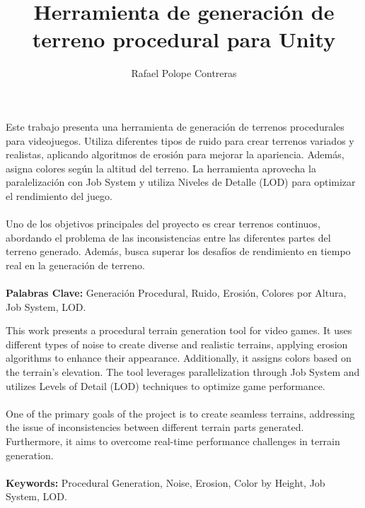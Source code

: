 \documentclass[book,spanish,a4paper,12pt]{tfg}
\title{Herramienta de generación de terreno procedural para Unity}
\author{Rafael Polope Contreras}
\begin{document}
\portada
\cleardoublepage


\begin{resumen}
  Este trabajo presenta una herramienta de generación de terrenos procedurales para videojuegos. Utiliza diferentes tipos de ruido para crear terrenos variados y realistas, aplicando algoritmos de erosión para mejorar la apariencia. Además, asigna colores según la altitud del terreno. La herramienta aprovecha la paralelización con Job System y utiliza Niveles de Detalle (LOD) para optimizar el rendimiento del juego.\\
  \\
  Uno de los objetivos principales del proyecto es crear terrenos continuos, abordando el problema de las inconsistencias entre las diferentes partes del terreno generado. Además, busca superar los desafíos de rendimiento en tiempo real en la generación de terreno.\\
  \\
  \textbf{Palabras Clave:} Generación Procedural, Ruido, Erosión, Colores por Altura, Job System, LOD.
\end{resumen}

\cleardoublepage

\begin{resumen}
  This work presents a procedural terrain generation tool for video games. It uses different types of noise to create diverse and realistic terrains, applying erosion algorithms to enhance their appearance. Additionally, it assigns colors based on the terrain's elevation. The tool leverages parallelization through Job System and utilizes Levels of Detail (LOD) techniques to optimize game performance.\\
  \\
  One of the primary goals of the project is to create seamless terrains, addressing the issue of inconsistencies between different terrain parts generated. Furthermore, it aims to overcome real-time performance challenges in terrain generation.\\
  \\
  \textbf{Keywords:} Procedural Generation, Noise, Erosion, Color by Height, Job System, LOD.
\end{resumen}

\cleardoublepage
\end{document}
